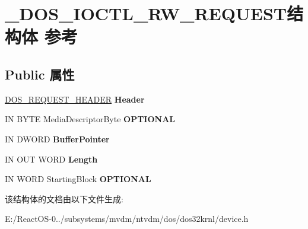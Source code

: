 \hypertarget{struct___d_o_s___i_o_c_t_l___r_w___r_e_q_u_e_s_t}{}\section{\+\_\+\+D\+O\+S\+\_\+\+I\+O\+C\+T\+L\+\_\+\+R\+W\+\_\+\+R\+E\+Q\+U\+E\+S\+T结构体 参考}
\label{struct___d_o_s___i_o_c_t_l___r_w___r_e_q_u_e_s_t}
\subsection*{Public 属性}
\begin{DoxyCompactItemize}
\item 
\mbox{\label{struct___d_o_s___i_o_c_t_l___r_w___r_e_q_u_e_s_t_ac52d2a0fe0b6d056d279c1286fba778b}} 
\hyperlink{struct___d_o_s___r_e_q_u_e_s_t___h_e_a_d_e_r}{D\+O\+S\+\_\+\+R\+E\+Q\+U\+E\+S\+T\+\_\+\+H\+E\+A\+D\+ER} {\bfseries Header}
\item 
\mbox{\label{struct___d_o_s___i_o_c_t_l___r_w___r_e_q_u_e_s_t_ab912f7a891149e532a55a8f2b664f747}} 
IN B\+Y\+TE Media\+Descriptor\+Byte {\bfseries O\+P\+T\+I\+O\+N\+AL}
\item 
\mbox{\label{struct___d_o_s___i_o_c_t_l___r_w___r_e_q_u_e_s_t_a9ada3564b0e0d4d39020dc0bae1a977a}} 
IN D\+W\+O\+RD {\bfseries Buffer\+Pointer}
\item 
\mbox{\label{struct___d_o_s___i_o_c_t_l___r_w___r_e_q_u_e_s_t_a6120d72c792a1297710bbdc720dfb558}} 
IN O\+UT W\+O\+RD {\bfseries Length}
\item 
\mbox{\label{struct___d_o_s___i_o_c_t_l___r_w___r_e_q_u_e_s_t_a9d73a1457e60f16d3dc1d60b98cc3154}} 
IN W\+O\+RD Starting\+Block {\bfseries O\+P\+T\+I\+O\+N\+AL}
\end{DoxyCompactItemize}


该结构体的文档由以下文件生成\+:\begin{DoxyCompactItemize}
\item 
E\+:/\+React\+O\+S-\/0../subsystems/mvdm/ntvdm/dos/dos32krnl/device.\+h\end{DoxyCompactItemize}
